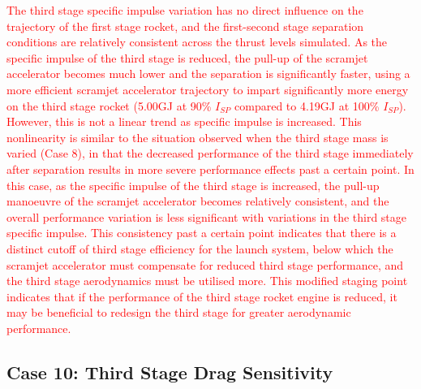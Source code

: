 \textcolor{red}{
The third stage specific impulse variation has no direct influence on the trajectory of the first stage rocket, and the first-second stage separation conditions are relatively consistent across the thrust levels simulated.
As the specific impulse of the third stage is reduced, the pull-up of the scramjet accelerator becomes much lower and the separation is significantly faster, using a more efficient scramjet accelerator trajectory to impart significantly more energy on the third stage rocket (5.00GJ at 90\% $I_{SP}$ compared to 4.19GJ at 100\% $I_{SP}$). However, this is not a linear trend as specific impulse is increased. This nonlinearity is similar to the situation observed when the third stage mass is varied (Case 8), in that the decreased performance of the third stage immediately after separation results in more severe performance effects past a certain point. In this case, as the specific impulse of the third stage is increased, the pull-up manoeuvre of the scramjet accelerator becomes relatively consistent, and the overall performance variation is less significant with variations in the third stage specific impulse. This consistency past a certain point indicates that there is a distinct cutoff of third stage efficiency for the launch system, below which the scramjet accelerator must compensate for reduced third stage performance, and the third stage aerodynamics must be utilised more. This modified staging point indicates that if the performance of the third stage rocket engine is reduced, it may be beneficial to redesign the third stage for greater aerodynamic performance. 
}



\subsection{Case 10: Third Stage Drag Sensitivity}


